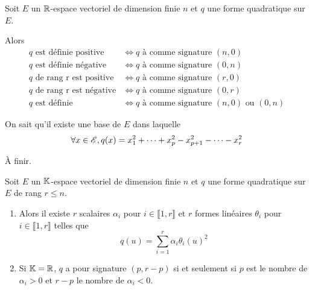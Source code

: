 \documentclass[a4paper, 12pt]{article}
\begin{document}
\begin{proposition}{}{}
    Soit $E$ un $\mathbb{R}$-espace vectoriel de dimension finie $n$ et $q$ une forme quadratique sur $E$.

    Alors
    \begin{align*}
        q \text{ est définie positive} &\iff q \text{ à comme signature } (n, 0) \\
        q \text{ est définie négative} &\iff q \text{ à comme signature } (0, n) \\
        q \text{ de rang r est positive} &\iff q \text{ à comme signature } (r, 0) \\
        q \text{ de rang r est négative} &\iff q \text{ à comme signature } (0, r) \\
        q \text{ est définie} &\iff q \text{ à comme signature } (n, 0) \text{ ou } (0, n)
    \end{align*}
\end{proposition}

\begin{demonstration}
    On sait qu'il existe une base de $E$ dans laquelle
    $$
    \forall x \in \mathscr{E}, q(x) = x_1^2 + \cdots + x_p^2 - x_{p+1}^2 - \cdots - x_r^2
    $$
    \begin{hotwarn}
        À finir.
    \end{hotwarn}
\end{demonstration}

\begin{theoreme}{}{}
    Soit $E$ un $\mathbb{K}$-espace vectoriel de dimension finie $n$ et $q$ une forme quadratique sur $E$ de rang $r \leq n$.

    \begin{enumerate}
        \item 
        Alors il existe $r$ scalaires $\alpha_i$ pour $i \in \llbracket 1, r \rrbracket$ et
        $r$ formes linéaires $\theta_i$ pour $i \in \llbracket 1, r \rrbracket$ telles que
        $$
        q(u) = \sum_{i=1}^r \alpha_i \theta_i(u)^2
        $$

        \item
        Si $\mathbb{K} = \mathbb{R}$, $q$ a pour signature $(p, r - p)$ si et seulement si $p$ est le nombre de $\alpha_i > 0$ et $r - p$ le nombre de $\alpha_i < 0$. 
\end{enumerate}
\end{theoreme}
\end{document}
